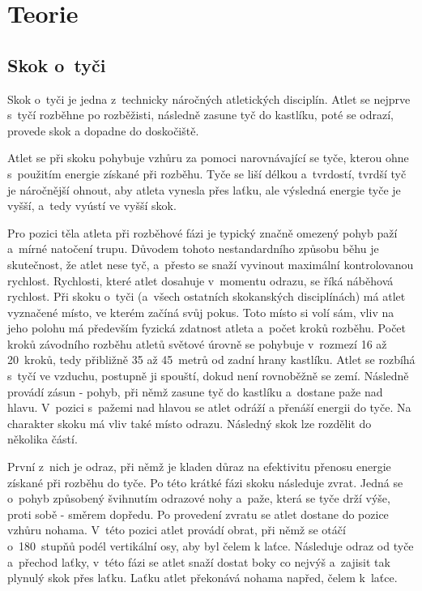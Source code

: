 \chapter{Teorie}

\section{Skok o~tyči}

Skok o~tyči je jedna z~technicky náročných atletických disciplín. Atlet se nejprve s~tyčí rozběhne po rozběžisti, následně zasune tyč do kastlíku, poté se odrazí, provede skok a dopadne do doskočiště.

Atlet se při skoku pohybuje vzhůru za pomoci narovnávající se tyče, kterou ohne s~použitím energie získané při rozběhu. Tyče se liší délkou a~tvrdostí, tvrdší tyč je náročnější ohnout, aby atleta vynesla přes laťku, ale výsledná energie tyče je vyšší, a~tedy vyústí ve vyšší skok.

Pro pozici těla atleta při rozběhové fázi je typický značně omezený pohyb paží a~mírné natočení trupu. Důvodem tohoto nestandardního způsobu běhu je skutečnost, že atlet nese tyč, a~přesto se snaží vyvinout maximální kontrolovanou rychlost. Rychlosti, které atlet dosahuje v~momentu odrazu, se říká náběhová rychlost. Při skoku o~tyči (a~všech ostatních skokanských disciplínách) má atlet vyznačené místo, ve kterém začíná svůj pokus. Toto místo si volí sám, vliv na jeho polohu má především fyzická zdatnost atleta a~počet kroků rozběhu. Počet kroků závodního rozběhu atletů světové úrovně se pohybuje v~rozmezí 16 až 20~kroků, tedy přibližně 35 až 45~metrů od zadní hrany kastlíku. Atlet se rozbíhá s~tyčí ve vzduchu, postupně ji spouští, dokud není rovnoběžně se zemí. Následně provádí zásun - pohyb, při němž zasune tyč do kastlíku a~dostane paže nad hlavu. V~pozici s~pažemi nad hlavou se atlet odráží a přenáší energii do tyče. Na charakter skoku má vliv také místo odrazu. Následný skok lze rozdělit do několika částí.

První z~nich je odraz, při němž je kladen důraz na efektivitu přenosu energie získané při rozběhu do tyče. Po této krátké fázi skoku následuje zvrat. Jedná se o~pohyb způsobený švihnutím odrazové nohy a~paže, která se tyče drží výše, proti sobě - směrem dopředu. Po provedení zvratu se atlet dostane do pozice vzhůru nohama. V~této pozici atlet provádí obrat, při němž se otáčí o~180~stupňů podél vertikální osy, aby byl čelem k laťce. Následuje odraz od tyče a~přechod laťky, v~této fázi se atlet snaží dostat boky co nejvýš a~zajisit tak plynulý skok přes laťku. Laťku atlet překonává nohama napřed, čelem k~laťce.

